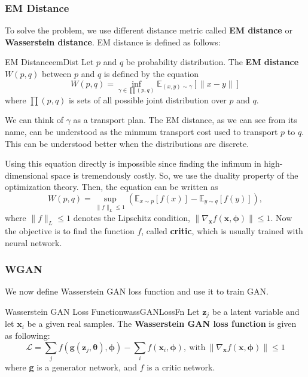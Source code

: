 \documentclass{article}
\begin{document}
        \subsubsection{EM Distance}
            To solve the problem, we use different distance metric called \textbf{EM distance} or \textbf{Wasserstein distance}.
            EM distance is defined as follows:
            \begin{defn}{EM Distance}{emDist}
                Let $p$ and $q$ be probability distribution. The \textbf{EM distance} $W(p,q)$ between $p$ and $q$ is defined by the equation
                \[
                W(p,q)=\inf_{\gamma \in \prod(p,q)}\mathbb E_{(x,y) \sim \gamma}[\|x-y\|]
                \]
                where $\prod(p,q)$ is sets of all possible joint distribution over $p$ and $q$.
            \end{defn}
            We can think of $\gamma$ as a transport plan. The EM distance, as we can see from its name,
            can be understood as the minmum transport cost used to transport $p$ to $q$.
            This can be understood better when the distributions are discrete.

            Using this equation directly is impossible since finding the infimum in
            high-dimensional space is tremendously costly. So, we use the duality property of the optimization theory.
            Then, the equation can be written as
            \[
            W(p,q)=\sup_{\|f\|_L \leq 1}(\mathbb E_{x \sim p}[f(x)] - \mathbb E_{y \sim q}[f(y)]),
            \]
            where $\|f\|_L \leq 1$ denotes the Lipschitz condition, $\|\nabla_{\textbf{x}}f(\textbf{x}, \bm{\phi})\| \leq 1$.
            Now the objective is to find the function $f$, called \textbf{critic}, which is usually trained with neural network.
        
        \subsubsection{WGAN}
            We now define Wasserstein GAN loss function and use it to train GAN.
            \begin{defn}{Wasserstein GAN Loss Function}{wassGANLossFn}
                Let $\textbf{z}_j$ be a latent variable and let $\textbf{x}_i$ be a given real samples.
                The \textbf{Wasserstein GAN loss function} is given as following:
                \[
                \mathcal L = \sum_{j} f(\textbf{g}(\textbf{z}_j, \bm{\theta}), \bm{\phi}) - \sum_{i} f(\textbf{x}_i, \bm{\phi}),
                \ \text{with} \ \|\nabla_{\textbf{x}}f(\textbf{x}, \bm{\phi})\| \leq 1
                \]
                where \textbf{g} is a generator network, and $f$ is a critic network.
            \end{defn}
\end{document}
